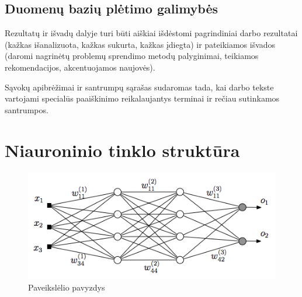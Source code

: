 \documentclass{VUMIFPSkursinis}
\begin{document}
\subsection{Duomenų bazių plėtimo galimybės}


Rezultatų ir išvadų dalyje turi būti aiškiai išdėstomi pagrindiniai darbo
rezultatai (kažkas išanalizuota, kažkas sukurta, kažkas įdiegta) ir pateikiamos
išvados (daromi nagrinėtų problemų sprendimo metodų palyginimai, teikiamos
rekomendacijos, akcentuojamos naujovės).

\printbibliography[heading=bibintoc]  %

Sąvokų apibrėžimai ir santrumpų sąrašas sudaromas tada, kai darbo tekste
vartojami specialūs paaiškinimo reikalaujantys terminai ir rečiau sutinkamos
santrumpos.

\appendix  %

\section{Niauroninio tinklo struktūra}
\begin{figure}[H]
    \centering
    \includegraphics[scale=0.5]{img/MLP}
    \caption{Paveikslėlio pavyzdys}
    \label{img:mlp}
\end{figure}
\end{document}
